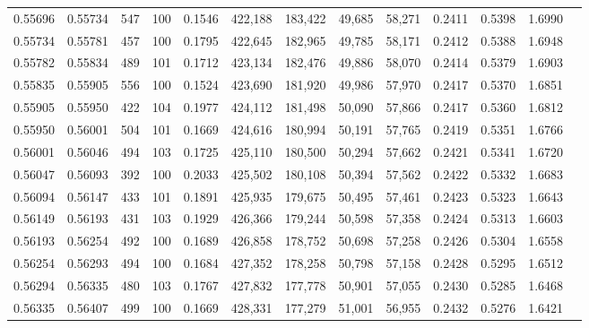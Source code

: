 \begin{tabular}{rrrrrrrrrrrrr}
0.55696 & 0.55734 &   547 & 100 &                                     0.1546 & 422,188 & 183,422 &  49,685 &  58,271 & 0.2411 & 0.5398 & 1.6990 \\
0.55734 & 0.55781 &   457 & 100 &                                     0.1795 & 422,645 & 182,965 &  49,785 &  58,171 & 0.2412 & 0.5388 & 1.6948 \\
0.55782 & 0.55834 &   489 & 101 &                                     0.1712 & 423,134 & 182,476 &  49,886 &  58,070 & 0.2414 & 0.5379 & 1.6903 \\
0.55835 & 0.55905 &   556 & 100 &                                     0.1524 & 423,690 & 181,920 &  49,986 &  57,970 & 0.2417 & 0.5370 & 1.6851 \\
0.55905 & 0.55950 &   422 & 104 &                                     0.1977 & 424,112 & 181,498 &  50,090 &  57,866 & 0.2417 & 0.5360 & 1.6812 \\
0.55950 & 0.56001 &   504 & 101 &                                     0.1669 & 424,616 & 180,994 &  50,191 &  57,765 & 0.2419 & 0.5351 & 1.6766 \\
0.56001 & 0.56046 &   494 & 103 &                                     0.1725 & 425,110 & 180,500 &  50,294 &  57,662 & 0.2421 & 0.5341 & 1.6720 \\
0.56047 & 0.56093 &   392 & 100 &                                     0.2033 & 425,502 & 180,108 &  50,394 &  57,562 & 0.2422 & 0.5332 & 1.6683 \\
0.56094 & 0.56147 &   433 & 101 &                                     0.1891 & 425,935 & 179,675 &  50,495 &  57,461 & 0.2423 & 0.5323 & 1.6643 \\
0.56149 & 0.56193 &   431 & 103 &                                     0.1929 & 426,366 & 179,244 &  50,598 &  57,358 & 0.2424 & 0.5313 & 1.6603 \\
0.56193 & 0.56254 &   492 & 100 &                                     0.1689 & 426,858 & 178,752 &  50,698 &  57,258 & 0.2426 & 0.5304 & 1.6558 \\
0.56254 & 0.56293 &   494 & 100 &                                     0.1684 & 427,352 & 178,258 &  50,798 &  57,158 & 0.2428 & 0.5295 & 1.6512 \\
0.56294 & 0.56335 &   480 & 103 &                                     0.1767 & 427,832 & 177,778 &  50,901 &  57,055 & 0.2430 & 0.5285 & 1.6468 \\
0.56335 & 0.56407 &   499 & 100 &                                     0.1669 & 428,331 & 177,279 &  51,001 &  56,955 & 0.2432 & 0.5276 & 1.6421 \\

\end{tabular}
